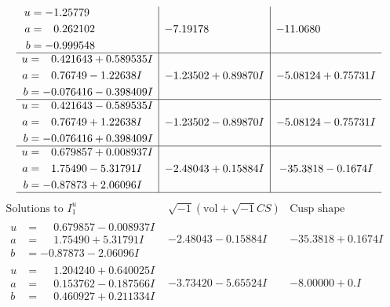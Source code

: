\documentclass[1p]{elsarticle_modified}
\theoremstyle{definition}
\newcommand{\I}{\sqrt{-1}}
\begin{document}
$$\begin{array}{c|c|c}
\begin{aligned}
u &= -1.25779\phantom{ +0.000000I} \\
a &= \phantom{-}0.262102\phantom{ +0.000000I} \\
b &= -0.999548\phantom{ +0.000000I}\end{aligned}
 & -7.19178\phantom{ +0.000000I} & -11.0680\phantom{ +0.000000I} \\ \hline\begin{aligned}
u &= \phantom{-}0.421643 + 0.589535 I \\
a &= \phantom{-}0.76749 - 1.22638 I \\
b &= -0.076416 - 0.398409 I\end{aligned}
 & -1.23502 + 0.89870 I & -5.08124 + 0.75731 I \\ \hline\begin{aligned}
u &= \phantom{-}0.421643 - 0.589535 I \\
a &= \phantom{-}0.76749 + 1.22638 I \\
b &= -0.076416 + 0.398409 I\end{aligned}
 & -1.23502 - 0.89870 I & -5.08124 - 0.75731 I \\ \hline\begin{aligned}
u &= \phantom{-}0.679857 + 0.008937 I \\
a &= \phantom{-}1.75490 - 5.31791 I \\
b &= -0.87873 + 2.06096 I\end{aligned}
 & -2.48043 + 0.15884 I & -35.3818 - 0.1674 I\\
 \hline 
 \end{array}$$\newpage$$\begin{array}{c|c|c}  
\text{Solutions to }I^u_{1}& \I (\text{vol} + \sqrt{-1}CS) & \text{Cusp shape}\\
 \hline 
\begin{aligned}
u &= \phantom{-}0.679857 - 0.008937 I \\
a &= \phantom{-}1.75490 + 5.31791 I \\
b &= -0.87873 - 2.06096 I\end{aligned}
 & -2.48043 - 0.15884 I & -35.3818 + 0.1674 I \\ \hline\begin{aligned}
u &= \phantom{-}1.204240 + 0.640025 I \\
a &= \phantom{-}0.153762 - 0.187566 I \\
b &= \phantom{-}0.460927 + 0.211334 I\end{aligned}
 & -3.73420 - 5.65524 I & -8.00000 + 0. I\phantom{ +0.000000I} \\ \hline\begin{aligned}

\end{aligned}
\end{array}$$
\end{document}
